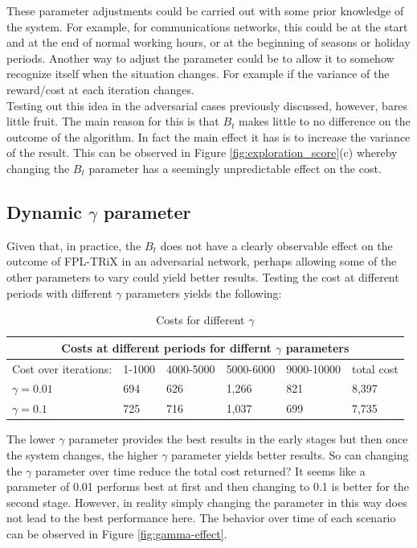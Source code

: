 These parameter adjustments could be carried out with some prior knowledge of the system. For example, for communications networks, this could be at the start and at the end of normal working hours, or at the beginning of seasons or holiday periods. Another way to adjust the parameter could be to allow it to somehow recognize itself when the situation changes. For example if the variance of the reward/cost at each iteration changes.\\

Testing out this idea in the adversarial cases previously discussed, however, bares little fruit. The main reason for this is that $B_t$ makes little to no difference on the outcome of the algorithm. In fact the main effect it has is to increase the variance of the result. This can be observed in Figure \ref{fig:exploration_score}(c) whereby changing the $B_t$ parameter has a seemingly unpredictable effect on the cost.\\


\subsection{Dynamic $\gamma$ parameter}

Given that, in practice, the $B_t$ does not have a clearly observable effect on the outcome of FPL-TRiX in an adversarial network, perhaps allowing some of the other parameters to vary could yield better results. Testing the cost at different periods with different $\gamma$ parameters yields the following:\\

\begin{table}[h]
\begin{tabular}{ |p{3.2cm}||p{1.6cm}|p{1.6cm}|p{1.6cm}|p{1.6cm}|p{1.6cm}|  }
 \hline
 \multicolumn{6}{|c|}{Costs at different periods for differnt $\gamma$ parameters}  \\
 \hline
 Cost over  iterations:& 1-1000  & 4000-5000 & 5000-6000 & 9000-10000  & total cost  \\
 \hline
 $\gamma=0.01$        & 694     & 626       & 1,266     & 821         & 8,397       \\
 $\gamma=0.1$         & 725     & 716       & 1,037     & 699         & 7,735       \\
 \hline
\end{tabular}
\caption{Costs for different $\gamma$}
\end{table}

The lower $\gamma$ parameter provides the best results in the early stages but then once the system changes, the higher $\gamma$ parameter yields better results. So can changing the $\gamma$ parameter over time reduce the total cost returned? It seems like a parameter of 0.01 performs best at first and then changing to 0.1 is better for the second stage. However, in reality simply changing the parameter in this way does not lead to the best performance here. The behavior over time of each scenario can be observed in Figure \ref{fig:gamma-effect}.\\

